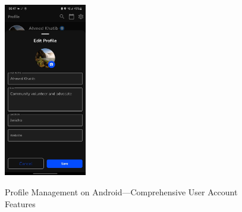 \begin{figure}[!htbp]
{        \includegraphics[width=0.32\textwidth]{figures/ui/edit_profile_android.jpeg}
    }
    \caption{Profile Management on Android---Comprehensive User Account Features}\label{fig:android_profile_management}
\end{figure}

